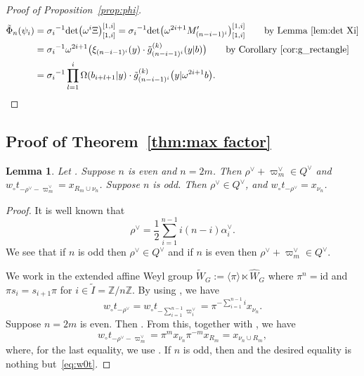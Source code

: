 \documentclass[10pt,a4paper]{amsart}
\numberwithin{equation}{section}
\newcommand{\co}{\xi}
\newcommand{\Z}{\mathbb{Z}}
\newcommand{\fac}{\psi}
\newtheorem{Lemma}[Theorem]{Lemma}
\theoremstyle{definition}
\begin{document}
\begin{proof}
[Proof of Proposition~\ref{prop:phi}]
\begin{align*}
\tilde{\Phi}_n(\fac_i)&=
{\sigma_i}^{-1}{\det}\bigl(\omega^{i} \Xi\bigr)^{[1,i]}_{[1,i]}={\sigma_i}^{-1}{\det}\bigl(\omega^{2i+1} M'_{(n-i-1)^i}\bigr)^{[1,i]}_{[1,i]} \qquad\text{by Lemma~\ref{lem:det Xi}}\\
&={\sigma_i}^{-1}
\omega^{2i+1}\bigl({\co_{(n-i-1)^i}(y)}\cdot{\tilde{g}^{(k)}_{(n-i-1)^i}(y|b)}\bigr)\qquad\text{by Corollary~\ref{cor:g_rectangle}}\\
&={\sigma_i}^{-1}\prod_{l=1}^i\Omega(b_{i+l+1}|y)\cdot\tilde{g}^{(k)}_{(n-i-1)^i}\bigl(y|\omega^{2i+1}b\bigr).\tag*{\qed}
\end{align*}\renewcommand{\qed}{}
\end{proof}

\subsection{Proof of Theorem~\ref{thm:max factor}}
\begin{Lemma}\label{lem:rho check}
Let .
Suppose $n$ is even and $n=2m$. Then
$\rho^\lor+\varpi_m^\lor\in Q^{\lor}$ and
$
w_\circ t_{-\rho^\lor-\varpi_m^\lor}
=x_{R_m\cup \nu_n}$.
Suppose $n$ is odd. Then $\rho^\lor\in Q^{\lor}$, and
$
w_\circ t_{-\rho^\lor}
=x_{\nu_n}$.
\end{Lemma}
\begin{proof}
It is well known that
\begin{equation}\label{eq:rho check}
\rho^\lor=\frac{1}{2}\sum_{i=1}^{n-1
}i(n-i)\alpha_i^\lor.
\end{equation}
We see that if $n$ is odd then $\rho^\lor\in Q^\lor$
and if $n$ is even then
$\rho^\lor+\varpi_m^\lor\in Q^\lor$.


We work in the extended affine Weyl group $\tilde{W}_G:=\langle \pi\rangle\ltimes \hat{W}_G$
where $\pi^n=\mathrm{id}$ and $\pi s_i=s_{i+1}\pi$ for $i\in \tilde{I}=\Z/n\Z$.
By using \cite[Lemma 4.6]{IIN}, we have
\begin{equation}
\label{eq:w0t}
w_\circ t_{-\rho^\lor}=
w_\circ t_{-\sum_{i=1}^{n-1}\varpi_i^\lor}=
\pi^{-\sum_{i=1}^{n-1}i}x_{\nu_n}.
\end{equation}
Suppose $n=2m$ is even.
Then .
From this, together with
,
we have
\[
w_\circ t_{-\rho^\lor-\varpi_m^\lor}
=\pi^{m}x_{\nu_n}\pi^{-m} x_{R_m}
=x_{\nu_n\cup R_m},
\]
where, for the last equality, we use \cite[Lem\-ma~2.15]{Tak}.
If $n$ is odd, then
 and the desired equality is nothing but~\eqref{eq:w0t}.
\end{proof}
\end{document}
